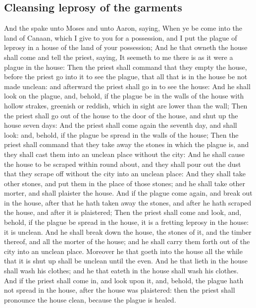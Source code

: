 \begin{biblechapter}
\section*{Cleansing leprosy of the garments}
\verse And the \LORD spake unto Moses and unto Aaron, saying,
\verse When ye be come into the land of Canaan, which I give to you for a possession, and I put the plague of leprosy in a house of the land of your possession;
\verse And he that owneth the house shall come and tell the priest, saying, It seemeth to me there is as it were a plague in the house:
\verse Then the priest shall command that they empty the house, before the priest go into it to see the plague, that all that is in the house be not made unclean: and afterward the priest shall go in to see the house:
\verse And he shall look on the plague, and, behold, if the plague be in the walls of the house with hollow strakes, greenish or reddish, which in sight are lower than the wall;
\verse Then the priest shall go out of the house to the door of the house, and shut up the house seven days:
\verse And the priest shall come again the seventh day, and shall look: and, behold, if the plague be spread in the walls of the house;
\verse Then the priest shall command that they take away the stones in which the plague is, and they shall cast them into an unclean place without the city:
\verse And he shall cause the house to be scraped within round about, and they shall pour out the dust that they scrape off without the city into an unclean place:
\verse And they shall take other stones, and put them in the place of those stones; and he shall take other morter, and shall plaister the house.
\verse And if the plague come again, and break out in the house, after that he hath taken away the stones, and after he hath scraped the house, and after it is plaistered;
\verse Then the priest shall come and look, and, behold, if the plague be spread in the house, it is a fretting leprosy in the house: it is unclean.
\verse And he shall break down the house, the stones of it, and the timber thereof, and all the morter of the house; and he shall carry them forth out of the city into an unclean place.
\verse Moreover he that goeth into the house all the while that it is shut up shall be unclean until the even.
\verse And he that lieth in the house shall wash his clothes; and he that eateth in the house shall wash his clothes.
\verse And if the priest shall come in, and look upon it, and, behold, the plague hath not spread in the house, after the house was plaistered: then the priest shall pronounce the house clean, because the plague is healed.

\end{biblechapter}
